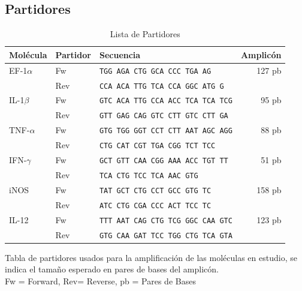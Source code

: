 \documentclass[12pt,letterpaper,oneside]{scrbook}
\begin{document}
\subsection{Partidores}

\begin{table}[h!]
    \begin{center}
        \begin{threeparttable}
            \caption{Lista de Partidores}\label{tabla:partidores}
            \begin{tabularx}{15cm}{l l X r}
                \toprule
                \textbf{Molécula}   & \textbf{Partidor} & \textbf{Secuencia} & \textbf{Amplicón} \\
                \midrule
                EF-1$\alpha$        & Fw    & \texttt{TGG AGA CTG GCA CCC TGA AG}       & 127 pb    \\
                                    & Rev   & \texttt{CCA ACA TTG TCA CCA GGC ATG G}    &           \\
                IL-1$\beta$         & Fw    & \texttt{GTC ACA TTG CCA ACC TCA TCA TCG}  & 95 pb     \\
                                    & Rev   & \texttt{GTT GAG CAG GTC CTT GTC CTT GA}   &           \\
                TNF-$\alpha$        & Fw    & \texttt{GTG TGG GGT CCT CTT AAT AGC AGG}  & 88 pb     \\
                                    & Rev   & \texttt{CTG CAT CGT TGA CGG TCT TCC}      &           \\
                IFN-$\gamma$        & Fw    & \texttt{GCT GTT CAA CGG AAA ACC TGT TT}   & 51 pb     \\
                                    & Rev   & \texttt{TCA CTG TCC TCA AAC GTG}          &           \\
                iNOS                & Fw    & \texttt{TAT GCT CTG CCT GCC GTG TC}       & 158 pb    \\
                                    & Rev   & \texttt{ATC CTG CGA CCC ACT TCC TC}       &           \\
                IL-12               & Fw    & \texttt{TTT AAT CAG CTG TCG GGC CAA GTC}  & 123 pb    \\
                                    & Rev   & \texttt{GTG CAA GAT TCC TGG CTG TCA GTA}  &           \\
                \bottomrule                         
            \end{tabularx}
            \begin{tablenotes}
                \item Tabla de partidores usados para la amplificación de las moléculas en estudio, se indica el tamaño esperado en pares de bases del amplicón. \\ Fw = Forward, Rev= Reverse, pb = Pares de Bases
            \end{tablenotes}
        \end{threeparttable}
    \end{center}
\end{table}
\end{document}
